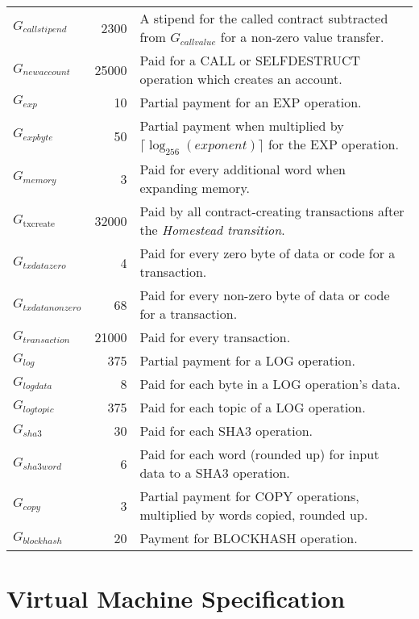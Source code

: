 \documentclass[9pt,oneside]{amsart}
\begin{document}
\begin{tabular*}{\columnwidth}[h]{lrl}
$G_{callstipend}$ & 2300 & A stipend for the called contract subtracted from $G_{callvalue}$ for a non-zero value transfer. \\
$G_{newaccount}$ & 25000 & Paid for a {\small CALL} or {\small SELFDESTRUCT} operation which creates an account. \\
$G_{exp}$ & 10 & Partial payment for an {\small EXP} operation. \\
$G_{expbyte}$ & 50 & Partial payment when multiplied by $\lceil\log_{256}(exponent)\rceil$ for the {\small EXP} operation. \\
$G_{memory}$ & 3 & Paid for every additional word when expanding memory. \\
$G_\text{txcreate}$ & 32000 & Paid by all contract-creating transactions after the {\it Homestead transition}.\\
$G_{txdatazero}$ & 4 & Paid for every zero byte of data or code for a transaction. \\
$G_{txdatanonzero}$ & 68 & Paid for every non-zero byte of data or code for a transaction. \\
$G_{transaction}$ & 21000 & Paid for every transaction. \\
$G_{log}$ & 375 & Partial payment for a {\small LOG} operation. \\
$G_{logdata}$ & 8 & Paid for each byte in a {\small LOG} operation's data. \\
$G_{logtopic}$ & 375 & Paid for each topic of a {\small LOG} operation. \\
$G_{sha3}$ & 30 & Paid for each {\small SHA3} operation. \\
$G_{sha3word}$ & 6 & Paid for each word (rounded up) for input data to a {\small SHA3} operation. \\
$G_{copy}$ & 3 & Partial payment for {\small *COPY} operations, multiplied by words copied, rounded up. \\
$G_{blockhash}$ & 20 & Payment for {\small BLOCKHASH} operation. \\

\bottomrule
\end{tabular*}

\section{Virtual Machine Specification}\label{app:vm}
\end{document}
